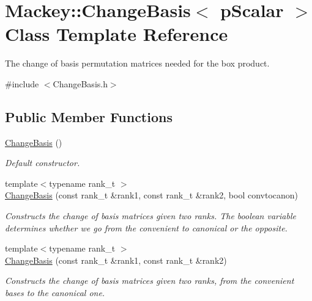 \hypertarget{classMackey_1_1ChangeBasis}{}\section{Mackey\+:\+:Change\+Basis$<$ p\+Scalar $>$ Class Template Reference}
\label{classMackey_1_1ChangeBasis}


The change of basis permutation matrices needed for the box product.  




{\ttfamily \#include $<$Change\+Basis.\+h$>$}

\subsection*{Public Member Functions}
\begin{DoxyCompactItemize}
\item 
\hyperlink{classMackey_1_1ChangeBasis_a1200b696d4b6db9ad942ee583c320a50}{Change\+Basis} ()
\begin{DoxyCompactList}\small\item\em Default constructor. \end{DoxyCompactList}\item 
{\footnotesize template$<$typename rank\+\_\+t $>$ }\\\hyperlink{classMackey_1_1ChangeBasis_a39b9a8d75509c70e728342172a321924}{Change\+Basis} (const rank\+\_\+t \&rank1, const rank\+\_\+t \&rank2, bool convtocanon)
\begin{DoxyCompactList}\small\item\em Constructs the change of basis matrices given two ranks. The boolean variable determines whether we go from the convenient to canonical or the opposite. \end{DoxyCompactList}\item 
{\footnotesize template$<$typename rank\+\_\+t $>$ }\\\hyperlink{classMackey_1_1ChangeBasis_a8cc49fe5537e7038ff7d142ba76e7c7b}{Change\+Basis} (const rank\+\_\+t \&rank1, const rank\+\_\+t \&rank2)
\begin{DoxyCompactList}\small\item\em Constructs the change of basis matrices given two ranks, from the convenient bases to the canonical one. \end{DoxyCompactList}\end{DoxyCompactItemize}
